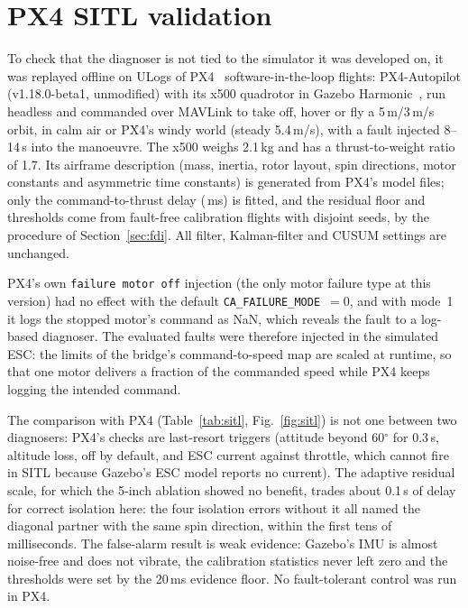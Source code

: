 \documentclass[conference]{IEEEtran}
\begin{document}
\section{PX4 SITL validation}
To check that the diagnoser is not tied to the simulator it was developed on, it was
replayed offline on ULogs of PX4~\cite{meier2015px4} software-in-the-loop flights:
PX4-Autopilot (v1.18.0-beta1, unmodified) with its x500 quadrotor in Gazebo
Harmonic~\cite{koenig2004gazebo}, run headless and commanded over
MAVLink to take off, hover or fly a 5\,m/3\,m/s orbit, in calm air or PX4's windy world (steady
5.4\,m/s), with a fault injected 8--14\,s into the manoeuvre. The x500 weighs 2.1\,kg and has a
thrust-to-weight ratio of 1.7. Its airframe description (mass, inertia, rotor layout, spin
directions, motor constants and asymmetric time constants) is generated from PX4's model
files; only the command-to-thrust delay (\resSitlDelayMs\,ms) is fitted, and the residual floor
and thresholds come from \resSitlNCal{} fault-free calibration flights with disjoint seeds, by the
procedure of Section~\ref{sec:fdi}. All filter, Kalman-filter and CUSUM settings are unchanged.

PX4's own \texttt{failure motor off} injection (the only motor failure type at this version) had
no effect with the default \texttt{CA\_FAILURE\_MODE}~$=0$, and with mode~1 it logs the stopped
motor's command as NaN, which reveals the fault to a log-based diagnoser. The evaluated faults
were therefore injected in the simulated ESC: the limits of the bridge's command-to-speed map are
scaled at runtime, so that one motor delivers a fraction of the commanded speed while PX4 keeps
logging the intended command.



The comparison with PX4 (Table~\ref{tab:sitl}, Fig.~\ref{fig:sitl}) is not one between two
diagnosers: PX4's checks are last-resort triggers (attitude beyond 60$^\circ$ for 0.3\,s,
altitude loss, off by default, and ESC current against throttle, which cannot fire in SITL
because Gazebo's ESC model reports no current). The adaptive residual scale, for which the
5-inch ablation showed no benefit, trades about 0.1\,s of delay for correct isolation here: the
four isolation errors without it all named the diagonal partner with the same spin direction,
within the first tens of milliseconds. The false-alarm result is weak evidence: Gazebo's IMU is
almost noise-free and does not vibrate, the calibration statistics never left zero and the
thresholds were set by the 20\,ms evidence floor. No fault-tolerant control was run in PX4.
\end{document}
